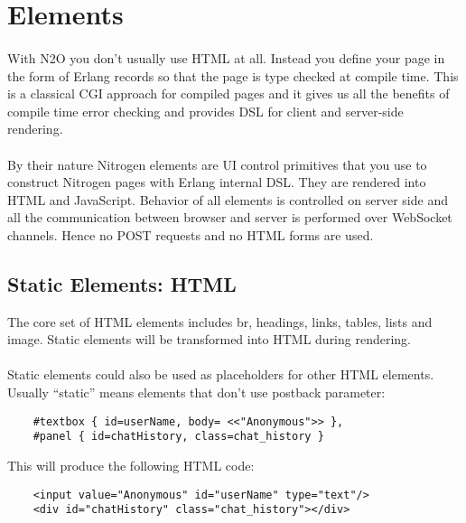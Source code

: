 \section{Elements}

\paragraph{}
With N2O you don't usually use HTML at all. Instead you define your page
in the form of Erlang records so that the page is type checked at compile time.
This is a classical CGI approach for compiled pages and it gives us all the benefits of
compile time error checking and provides DSL for client and server-side rendering.

\paragraph{}
By their nature Nitrogen elements are UI control primitives
that you use to construct Nitrogen pages with Erlang internal DSL.
They are rendered into HTML and JavaScript.
Behavior of all elements is controlled on server side and all the communication
between browser and server is performed over WebSocket channels.
Hence no POST requests and no HTML forms are used.

\subsection{Static Elements: HTML}
The core set of HTML elements includes br, headings, links, tables, lists and image.
Static elements will be transformed into HTML during rendering.

\paragraph{}
Static elements could also be used as placeholders for other HTML elements.
Usually ``static'' means elements that don't use postback parameter:

\vspace{1\baselineskip}
\begin{lstlisting}
    #textbox { id=userName, body= <<"Anonymous">> },
    #panel { id=chatHistory, class=chat_history }
\end{lstlisting}
\vspace{1\baselineskip}

This will produce the following HTML code:
\vspace{1\baselineskip}
\begin{lstlisting}
    <input value="Anonymous" id="userName" type="text"/>
    <div id="chatHistory" class="chat_history"></div>
\end{lstlisting}


